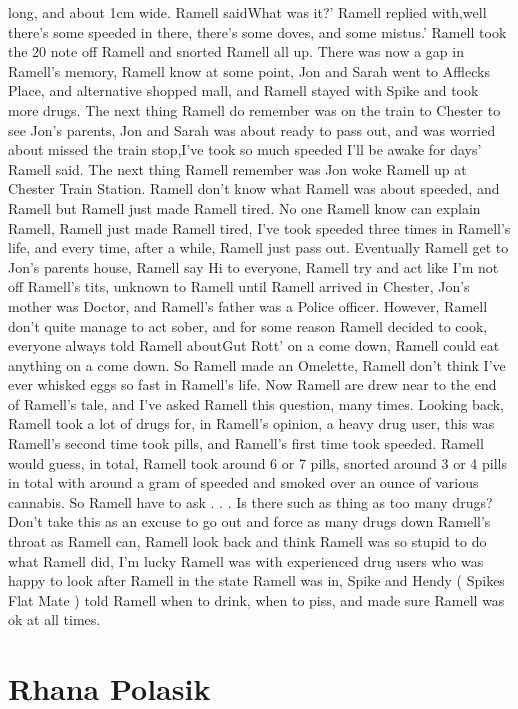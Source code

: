 \documentclass[12pt]{book}
\begin{document}
long, and about 1cm wide. Ramell saidWhat was it?' Ramell replied with,well there's some speeded in there, there's some doves, and some mistus.' Ramell took the 20 note off Ramell and snorted Ramell all up. There was now a gap in Ramell's memory, Ramell know at some point, Jon and Sarah went to Afflecks Place, and alternative shopped mall, and Ramell stayed with Spike and took more drugs. The next thing Ramell do remember was on the train to Chester to see Jon's parents, Jon and Sarah was about ready to pass out, and was worried about missed the train stop,I've took so much speeded I'll be awake for days' Ramell said. The next thing Ramell remember was Jon woke Ramell up at Chester Train Station. Ramell don't know what Ramell was about speeded, and Ramell but Ramell just made Ramell tired. No one Ramell know can explain Ramell, Ramell just made Ramell tired, I've took speeded three times in Ramell's life, and every time, after a while, Ramell just pass out. Eventually Ramell get to Jon's parents house, Ramell say Hi to everyone, Ramell try and act like I'm not off Ramell's tits, unknown to Ramell until Ramell arrived in Chester, Jon's mother was Doctor, and Ramell's father was a Police officer. However, Ramell don't quite manage to act sober, and for some reason Ramell decided to cook, everyone always told Ramell aboutGut Rott' on a come down, Ramell could eat anything on a come down. So Ramell made an Omelette, Ramell don't think I've ever whisked eggs so fast in Ramell's life. Now Ramell are drew near to the end of Ramell's tale, and I've asked Ramell this question, many times. Looking back, Ramell took a lot of drugs for, in Ramell's opinion, a heavy drug user, this was Ramell's second time took pills, and Ramell's first time took speeded. Ramell would guess, in total, Ramell took around 6 or 7 pills, snorted around 3 or 4 pills in total with around a gram of speeded and smoked over an ounce of various cannabis. So Ramell have to ask . . .  Is there such as thing as too many drugs? Don't take this as an excuse to go out and force as many drugs down Ramell's throat as Ramell can, Ramell look back and think Ramell was so stupid to do what Ramell did, I'm lucky Ramell was with experienced drug users who was happy to look after Ramell in the state Ramell was in, Spike and Hendy ( Spikes Flat Mate ) told Ramell when to drink, when to piss, and made sure Ramell was ok at all times.



\chapter{Rhana Polasik}
\end{document}
